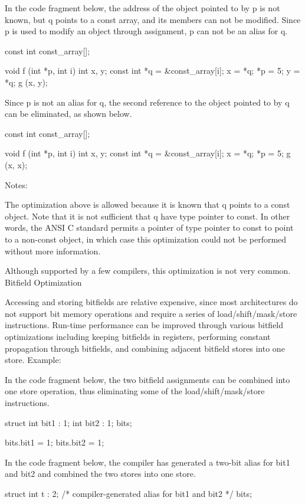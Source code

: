 {{{{{{{{{{In the code fragment below, the address of the object pointed to by p is not known, but q points to a const array, and its members can not be modified. Since p is used to modify an object through assignment, p can not be an alias for q.

    const int const_array[];

    void f (int *p, int i)
    {
      int x, y;
      const int *q = &const_array[i];
      x = *q;
      *p = 5;
      y = *q;
      g (x, y);
    }

Since p is not an alias for q, the second reference to the object pointed to by q can be eliminated, as shown below.

    const int const_array[];

    void f (int *p, int i)
    {
      int x, y;
      const int *q = &const_array[i];
      x = *q;
      *p = 5;
      g (x, x);
    }

Notes:

The optimization above is allowed because it is known that q points to a const object. Note that it is not sufficient that q have type pointer to const. In other words, the ANSI C standard permits a pointer of type pointer to const to point to a non-const object, in which case this optimization could not be performed without more information.

Although supported by a few compilers, this optimization is not very common.
Bitfield Optimization

Accessing and storing bitfields are relative expensive, since most architectures do not support bit memory operations and require a series of load/shift/mask/store instructions. Run-time performance can be improved through various bitfield optimizations including keeping bitfields in registers, performing constant propagation through bitfields, and combining adjacent bitfield stores into one store.
Example:

In the code fragment below, the two bitfield assignments can be combined into one store operation, thus eliminating some of the load/shift/mask/store instructions.

    struct
    {
      int bit1 : 1;
      int bit2 : 1;
    } bits;

    bits.bit1 = 1;
    bits.bit2 = 1;

In the code fragment below, the compiler has generated a two-bit alias for bit1 and bit2 and combined the two stores into one store.

    struct
    {
      int t : 2;   /* compiler-generated alias for bit1 and bit2 */
    } bits;

}}}}}}}}}}
